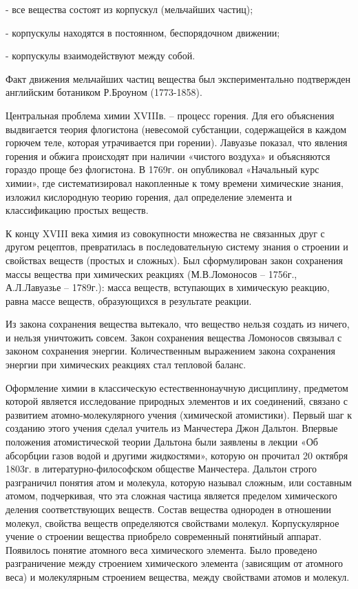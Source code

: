 \documentclass[exam_answers.tex]{subfiles}
\begin{document}
- все вещества состоят из корпускул (мельчайших частиц);

- корпускулы находятся в постоянном, беспорядочном движении;

- корпускулы взаимодействуют между собой.

Факт движения мельчайших частиц вещества был экспериментально
подтвержден английским ботаником Р.Броуном (1773-1858).

Центральная проблема химии XVIIIв. – процесс горения. Для его
объяснения выдвигается теория флогистона (невесомой субстанции,
содержащейся в каждом горючем теле, которая утрачивается при горении).
Лавуазье показал, что явления горения и обжига происходят при наличии
«чистого воздуха» и объясняются гораздо проще без флогистона. В 1769г. он
опубликовал «Начальный курс химии», где систематизировал накопленные к
тому времени химические знания, изложил кислородную теорию горения, дал
определение элемента и классификацию простых веществ.

К концу XVIII века химия из совокупности множества не связанных друг с
другом рецептов, превратилась в последовательную систему знания о строении
и свойствах веществ (простых и сложных). Был сформулирован закон
сохранения массы вещества при химических реакциях (М.В.Ломоносов –
1756г., А.Л.Лавуазье – 1789г.): масса веществ, вступающих в химическую
реакцию, равна массе веществ, образующихся в результате реакции.

Из закона сохранения вещества вытекало, что вещество нельзя создать из
ничего, и нельзя уничтожить совсем. Закон сохранения вещества Ломоносов
связывал с законом сохранения энергии. Количественным выражением закона
сохранения энергии при химических реакциях стал тепловой баланс.

Оформление химии в классическую естественнонаучную дисциплину,
предметом которой является исследование природных элементов и их
соединений, связано с развитием атомно-молекулярного учения (химической
атомистики). Первый шаг к созданию этого учения сделал учитель из
Манчестера Джон Дальтон. Впервые положения атомистической теории
Дальтона были заявлены в лекции «Об абсорбции газов водой и другими
жидкостями», которую он прочитал 20 октября 1803г. в литературно-философском
обществе Манчестера. Дальтон строго разграничил понятия атом
и молекула, которую называл сложным, или составным атомом, подчеркивая,
что эта сложная частица является пределом химического деления
соответствующих веществ. Состав вещества однороден в отношении молекул,
свойства веществ определяются свойствами молекул. Корпускулярное учение о
строении вещества приобрело современный понятийный аппарат. Появилось
понятие атомного веса химического элемента. Было проведено разграничение
между строением химического элемента (зависящим от атомного веса) и
молекулярным строением вещества, между свойствами атомов и молекул.
\end{document}

